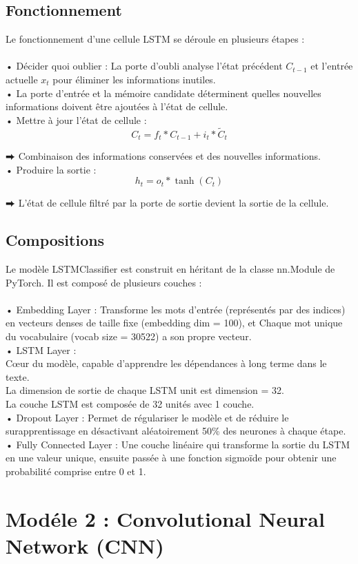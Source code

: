 \subsection{Fonctionnement}
Le fonctionnement d’une cellule LSTM se déroule en plusieurs étapes :
\\
\\
• Décider quoi oublier : La porte d’oubli analyse l’état précédent \( C_{t-1} \) et l’entrée actuelle \( x_t \) pour éliminer les informations inutiles.
\\
• La porte d’entrée et la mémoire candidate déterminent quelles nouvelles informations doivent être ajoutées à l’état de cellule.
\\
• Mettre à jour l’état de cellule : \[
C_t = f_t \ast C_{t-1} + i_t \ast \tilde{C}_t
\]

\noindent
⮕ Combinaison des informations conservées et des nouvelles informations.
\\
• Produire la sortie : \[
h_t = o_t \ast \tanh(C_t)
\]

\noindent
⮕ L’état de cellule filtré par la porte de sortie devient la sortie de la cellule.
\subsection{Compositions}
Le modèle LSTMClassifier est construit en héritant de la classe nn.Module de PyTorch. Il est composé de plusieurs couches :
\\
\\
• Embedding Layer : Transforme les mots d’entrée (représentés par des indices) en vecteurs denses de taille fixe (embedding dim = 100), et Chaque mot unique du vocabulaire (vocab size = 30522) a son propre vecteur.
\\
• LSTM Layer : 
\\
Cœur du modèle, capable d’apprendre les dépendances à long terme dans le texte.
\\
La dimension de sortie de chaque LSTM unit est dimension = 32.
\\
La couche LSTM est composée de 32 unités avec 1 couche.
\\
• Dropout Layer : Permet de régulariser le modèle et de réduire le surapprentissage en désactivant aléatoirement 50\% des neurones à chaque étape.
\\
• Fully Connected Layer : Une couche linéaire qui transforme la sortie du LSTM en une valeur unique, ensuite passée à une fonction sigmoïde pour obtenir une probabilité comprise entre 0 et 1.
\section{Modéle 2 : Convolutional Neural Network (CNN)}
